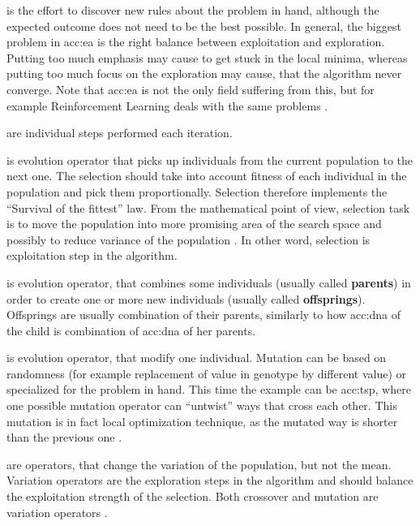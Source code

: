  is the effort to discover new rules about the problem in hand, although the expected outcome does not need to be the best possible. In general, the biggest problem in \acrshort{acc:ea} is the right balance between exploitation and exploration. Putting too much emphasis may cause to get stuck in the local minima, whereas putting too much focus on the exploration may cause, that the algorithm never converge. Note that \acrshort{acc:ea} is not the only field suffering from this, but for example Reinforcement Learning deals with the same problems \citep{ExplorationExploitationDilemaRL}. 

 are individual steps performed each iteration.

 is evolution operator that picks up individuals from the current population to the next one. The selection should take into account fitness of each individual in the population and pick them proportionally. Selection therefore implements the \enquote{Survival of the fittest} law. From the mathematical point of view, selection task is to move the population into more promising area of the search space and possibly to reduce variance of the population \citep{SelfAdaptiveFeaturesInRealParameterEvolutionaryAlgorithms}. In other word, selection is exploitation step in the algorithm.

 is evolution operator, that combines some individuals (usually called \textbf{parents}) in order to create one or more new individuals (usually called \textbf{offsprings}). Offsprings are usually combination of their parents, similarly to how \acrshort{acc:dna} of the child is combination of \acrshort{acc:dna} of her parents.

 is evolution operator, that modify one individual. Mutation can be based on randomness (for example replacement of value in genotype by different value) or specialized for the problem in hand. This time the example can be \acrlong{acc:tsp}, where one possible mutation operator can \enquote{untwist} ways that cross each other. This mutation is in fact local optimization technique, as the  mutated way is shorter than the previous one \citep{TSPArticle}.

 are operators, that change the variation of the population, but not the mean. Variation operators are the exploration steps in the algorithm and should balance the exploitation strength of the selection. Both crossover and mutation are variation operators \citep{SelfAdaptiveFeaturesInRealParameterEvolutionaryAlgorithms}.

